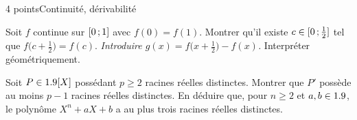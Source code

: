 \begin{exoEval}{4 points}{Continuité, dérivabilité}
\begin{questions}
  \item Soit $f$ continue sur $\mathopen{[}0\,{;}\,1\mathclose{]}$ avec $f(0)=f(1)$. Montrer
    qu'il existe $c\in\mathopen{[}0\,{;}\,\frac12\mathclose{]}$ tel que
    $f\bigl(c+\frac12\bigr)=f(c)$. \emph{Introduire
    $g(x)=f\bigl(x+\frac12\bigr)-f(x)$.} Interpréter géométriquement.
  \item Soit $P\in1.9[X]$ possédant $p\geqslant2$ racines réelles distinctes.
    Montrer que $P'$ possède au moins $p-1$ racines réelles distinctes. En
    déduire que, pour $n\geqslant2$ et $a,b\in1.9$, le polynôme
    $X^{n}+aX+b$ a au plus trois racines réelles distinctes.
\end{questions}
\end{exoEval}
